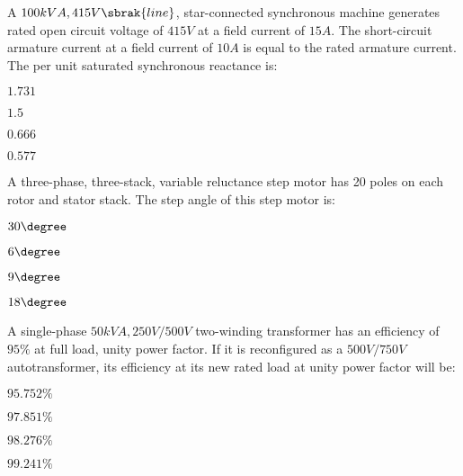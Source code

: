     \item A $100 kVA, 415 V \sbrak{line}$, star-connected synchronous machine generates rated open circuit voltage of $415 V$ at a field current of $15 A$. The short-circuit armature current at a field current of $10 A$ is equal to the rated armature current. The per unit saturated synchronous reactance is:
        \begin{enumerate}
                \begin{multicols}{2}
                \item $1.731$
                    \columnbreak
                \item $1.5$
                \end{multicols}
                \begin{multicols}{2}
                \item $0.666$
                    \columnbreak
                \item $0.577$
                \end{multicols}
        \end{enumerate}
    \item A three-phase, three-stack, variable reluctance step motor has 20 poles on each rotor and stator stack. The step angle of this step motor is:
        \begin{enumerate}
                \begin{multicols}{2}
                \item $30\degree$
                    \columnbreak
                \item $6\degree$
                \end{multicols}
                \begin{multicols}{2}
                \item $9\degree$
                    \columnbreak
                \item $18\degree$
                \end{multicols}
        \end{enumerate}
    \item A single-phase $50 kVA, 250 V/500 V$ two-winding transformer has an efficiency of $95\%$ at full load, unity power factor. If it is reconfigured as a $500 V/750 V$ autotransformer, its efficiency at its new rated load at unity power factor will be:
        \begin{enumerate}
                \begin{multicols}{2}
                \item $95.752\%$
                    \columnbreak
                \item $97.851\%$
                \end{multicols}
                \begin{multicols}{2}
                \item $98.276\%$
                    \columnbreak
                \item $99.241\%$
                \end{multicols}
        \end{enumerate}
